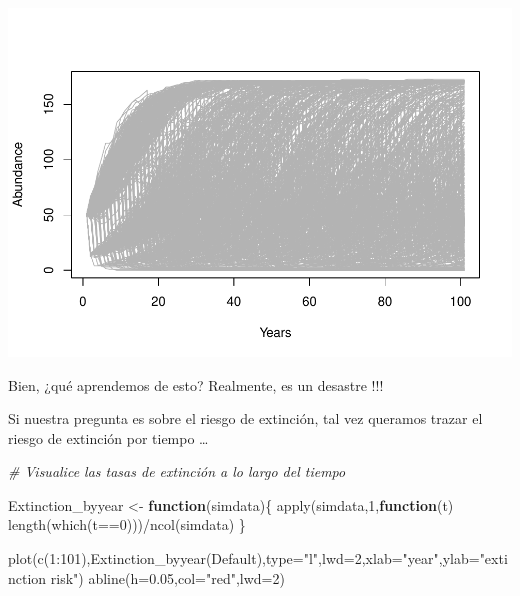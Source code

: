 \documentclass[
]{article}
\newenvironment{Shaded}{\begin{snugshade}}{\end{snugshade}}
\newcommand{\AttributeTok}[1]{\textcolor[rgb]{0.77,0.63,0.00}{#1}}
\newcommand{\CommentTok}[1]{\textcolor[rgb]{0.56,0.35,0.01}{\textit{#1}}}
\newcommand{\ControlFlowTok}[1]{\textcolor[rgb]{0.13,0.29,0.53}{\textbf{#1}}}
\newcommand{\DecValTok}[1]{\textcolor[rgb]{0.00,0.00,0.81}{#1}}
\newcommand{\FloatTok}[1]{\textcolor[rgb]{0.00,0.00,0.81}{#1}}
\newcommand{\FunctionTok}[1]{\textcolor[rgb]{0.00,0.00,0.00}{#1}}
\newcommand{\NormalTok}[1]{#1}
\newcommand{\OtherTok}[1]{\textcolor[rgb]{0.56,0.35,0.01}{#1}}
\newcommand{\SpecialCharTok}[1]{\textcolor[rgb]{0.00,0.00,0.00}{#1}}
\newcommand{\StringTok}[1]{\textcolor[rgb]{0.31,0.60,0.02}{#1}}
\begin{document}
\includegraphics{LECTURE12_files/figure-latex/unnamed-chunk-4-1.pdf}

Bien, ¿qué aprendemos de esto? Realmente, es un desastre !!!

Si nuestra pregunta es sobre el riesgo de extinción, tal vez queramos
trazar el riesgo de extinción por tiempo \ldots{}

\begin{Shaded}
\begin{Highlighting}[]
\CommentTok{\# Visualice las tasas de extinción a lo largo del tiempo}

\NormalTok{Extinction\_byyear }\OtherTok{\textless{}{-}} \ControlFlowTok{function}\NormalTok{(simdata)\{}
  \FunctionTok{apply}\NormalTok{(simdata,}\DecValTok{1}\NormalTok{,}\ControlFlowTok{function}\NormalTok{(t)  }\FunctionTok{length}\NormalTok{(}\FunctionTok{which}\NormalTok{(t}\SpecialCharTok{==}\DecValTok{0}\NormalTok{)))}\SpecialCharTok{/}\FunctionTok{ncol}\NormalTok{(simdata)}
\NormalTok{\}}

\FunctionTok{plot}\NormalTok{(}\FunctionTok{c}\NormalTok{(}\DecValTok{1}\SpecialCharTok{:}\DecValTok{101}\NormalTok{),}\FunctionTok{Extinction\_byyear}\NormalTok{(Default),}\AttributeTok{type=}\StringTok{"l"}\NormalTok{,}\AttributeTok{lwd=}\DecValTok{2}\NormalTok{,}\AttributeTok{xlab=}\StringTok{"year"}\NormalTok{,}\AttributeTok{ylab=}\StringTok{"extinction risk"}\NormalTok{)}
\FunctionTok{abline}\NormalTok{(}\AttributeTok{h=}\FloatTok{0.05}\NormalTok{,}\AttributeTok{col=}\StringTok{"red"}\NormalTok{,}\AttributeTok{lwd=}\DecValTok{2}\NormalTok{)}
\end{Highlighting}
\end{Shaded}
\end{document}
